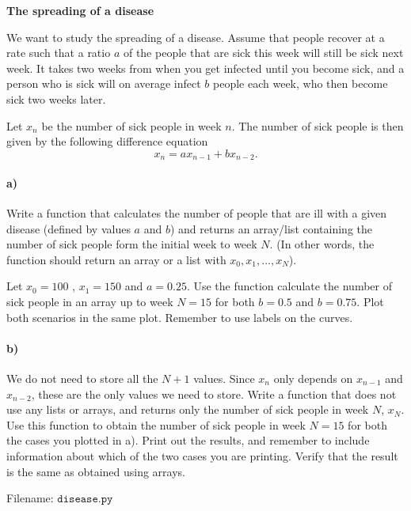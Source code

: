 \begin{Problem}{\textbf{The spreading of a disease}}

\noindent We want to study the spreading of a disease. Assume that people recover at a rate such that a ratio $a$ of the people
that are sick this week will still be sick next week. It takes two weeks from when you
get infected until you become sick, and a person who is sick will on average infect
$b$ people each week, who then become sick two weeks later. 

Let $x_n$ be the
number of sick people in week $n$. The number of sick people is then given by the following difference equation
\begin{equation*}
x_n = a x_{n-1} + b x_{n-2} .
\end{equation*}

\paragraph{a)} 
Write a function  that calculates the number of people that are ill with a given disease (defined by values $a$ and $b$) and returns an array/list containing the number of sick people form the initial week to week $N$. (In other words, the function should return an array or a list with $x_0, x_1, ..., x_N$). 

Let  $x_0 = 100$ , $x_1 = 150$ and $a = 0.25$. Use the function calculate the number of sick
people in an array up to week $N = 15$ for both $b = 0.5$ and $b = 0.75$. Plot both scenarios in the same plot. Remember to use labels on the curves.


\paragraph{b)}
We do not need to store all the $N + 1$ values. Since $x_n$ only depends on
$x_{n-1}$ and $x_{n-2}$, these are the only values we need to store. Write a function  that does not use any lists or arrays, and returns only the number of sick people in week $N$, $x_N$. Use this function to obtain the number of sick people in week $N = 15$ for both the cases you plotted in a). Print out the results, and remember to include information about which of the two cases you are printing. Verify that the result is the same as obtained using arrays. 

Filename: $\texttt{disease.py}$
\end{Problem} 


